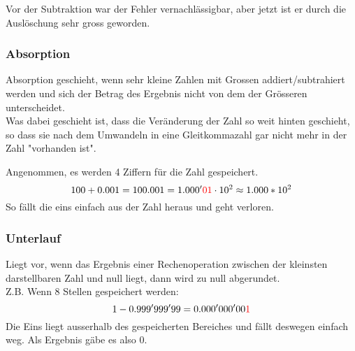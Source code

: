 Vor der Subtraktion war der Fehler vernachlässigbar, aber jetzt ist er durch die Auslöschung sehr gross geworden.

\subsubsection{Absorption}
Absorption geschieht, wenn sehr kleine Zahlen mit Grossen addiert/subtrahiert werden und sich der Betrag des Ergebnis nicht von dem der Grösseren unterscheidet. \\
Was dabei geschieht ist, dass die Veränderung der Zahl so weit hinten geschieht, so dass sie nach dem Umwandeln in eine Gleitkommazahl gar nicht mehr in der Zahl "vorhanden ist".
\begin{exmp}
	Angenommen, es werden 4 Ziffern für die Zahl gespeichert.
	\begin{displaymath}
		100+0.001=100.001 = 1.000'{\color{red}01} \cdot 10^2
		\approx 1.000 * 10^2
	\end{displaymath}
	So fällt die eins einfach aus der Zahl heraus und geht verloren.
\end{exmp}

\subsubsection{Unterlauf}
Liegt vor, wenn das Ergebnis einer Rechenoperation zwischen der kleinsten darstellbaren Zahl und null liegt, dann wird zu null abgerundet. \\
Z.B. Wenn 8 Stellen gespeichert werden:
\begin{displaymath}
	1-0.999'999'99 = 0.000'000'00 {\color{red} 1}
\end{displaymath}
Die Eins liegt ausserhalb des gespeicherten Bereiches und fällt deswegen einfach weg. Als Ergebnis gäbe es also  0.